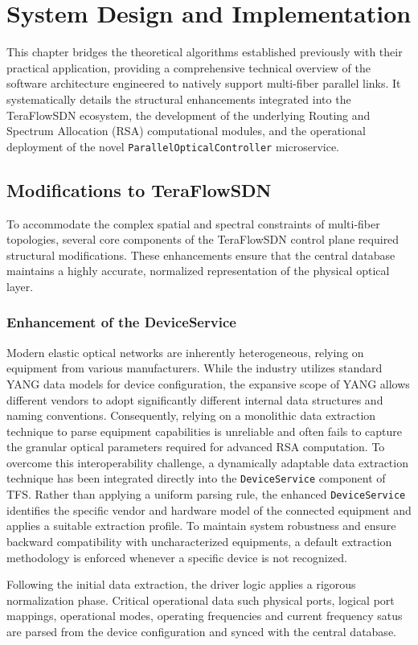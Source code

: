 \chapter{System Design and Implementation}
This chapter bridges the theoretical algorithms established previously with their practical application, providing a comprehensive technical overview of the software architecture engineered to natively support multi-fiber parallel links. It systematically details the structural enhancements integrated into the TeraFlowSDN ecosystem, the development of the underlying Routing and Spectrum Allocation (RSA) computational modules, and the operational deployment of the novel \texttt{ParallelOpticalController} microservice.
\section{Modifications to TeraFlowSDN}
To accommodate the complex spatial and spectral constraints of multi-fiber topologies, several core components of the TeraFlowSDN control plane required structural modifications. These enhancements ensure that the central database maintains a highly accurate, normalized representation of the physical optical layer.
\subsection{Enhancement of the DeviceService}
Modern elastic optical networks are inherently heterogeneous, relying on equipment from various manufacturers. While the industry utilizes standard YANG data models for device configuration, the expansive scope of YANG allows different vendors to adopt significantly different internal data structures and naming conventions. Consequently, relying on a monolithic data extraction technique to parse equipment capabilities is unreliable and often fails to capture the granular optical parameters required for advanced RSA computation. To overcome this interoperability challenge, a dynamically adaptable data extraction technique has been integrated directly into the \texttt{DeviceService} component of TFS. Rather than applying a uniform parsing rule, the enhanced \texttt{DeviceService} identifies the specific vendor and hardware model of the connected equipment and applies a suitable extraction profile. To maintain system robustness and ensure backward compatibility with uncharacterized equipments, a default extraction methodology is enforced whenever a specific device is not recognized.

Following the initial data extraction, the driver logic applies a rigorous normalization phase. Critical operational data such physical ports, logical port mappings, operational modes, operating frequencies and current frequency satus are parsed from the device configuration and synced with the central database.
